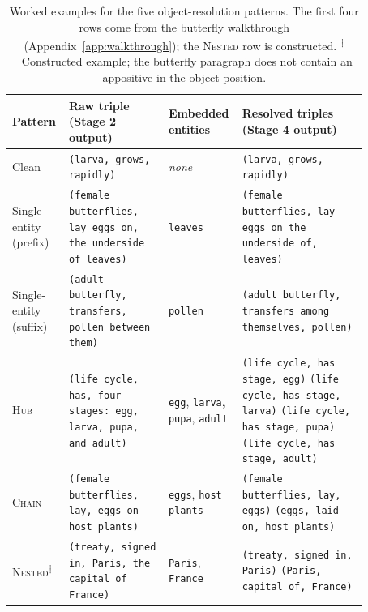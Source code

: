 \documentclass[11pt]{article}
\begin{document}
\begin{table}[t!]
\centering
\small
\setlength{\tabcolsep}{5pt}
\renewcommand{\arraystretch}{1.2}
\begin{tabular}{p{0.13\linewidth} | p{0.27\linewidth} | p{0.13\linewidth} | p{0.34\linewidth}}
\toprule
\textbf{Pattern} & \textbf{Raw triple (Stage 2 output)} & \textbf{Embedded entities} & \textbf{Resolved triples (Stage 4 output)} \\
\midrule
Clean & \texttt{(larva, grows, rapidly)} & \emph{none} & \texttt{(larva, grows, rapidly)} \\
\midrule
Single-entity \newline (prefix) & \texttt{(female butterflies, lay eggs on, the underside of leaves)} & \texttt{leaves} & \texttt{(female butterflies, lay eggs on the underside of, leaves)} \\
\midrule
Single-entity \newline (suffix) & \texttt{(adult butterfly, transfers, pollen between them)} & \texttt{pollen} & \texttt{(adult butterfly, transfers among themselves, pollen)} \\
\midrule
\textsc{Hub} & \texttt{(life cycle, has, four stages: egg, larva, pupa, and adult)} & \texttt{egg}, \texttt{larva}, \texttt{pupa}, \texttt{adult} & \texttt{(life cycle, has stage, egg)} \newline \texttt{(life cycle, has stage, larva)} \newline \texttt{(life cycle, has stage, pupa)} \newline \texttt{(life cycle, has stage, adult)} \\
\midrule
\textsc{Chain} & \texttt{(female butterflies, lay, eggs on host plants)} & \texttt{eggs}, \texttt{host plants} & \texttt{(female butterflies, lay, eggs)} \newline \texttt{(eggs, laid on, host plants)} \\
\midrule
\textsc{Nested}\textsuperscript{$\ddagger$} & \texttt{(treaty, signed in, Paris, the capital of France)} & \texttt{Paris}, \texttt{France} & \texttt{(treaty, signed in, Paris)} \newline \texttt{(Paris, capital of, France)} \\
\bottomrule
\end{tabular}
\caption{Worked examples for the five object-resolution patterns. The first four rows come from the butterfly walkthrough (Appendix~\ref{app:walkthrough}); the \textsc{Nested} row is constructed. \textsuperscript{$\ddagger$}~Constructed example; the butterfly paragraph does not contain an appositive in the object position.}
\label{tab:obj-res-examples}
\end{table}
\end{document}
